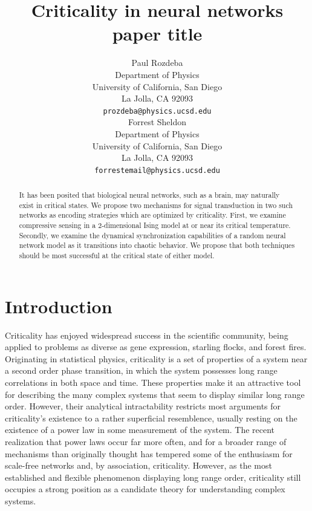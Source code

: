 \documentclass{article} %
\title{Criticality in neural networks paper title}
\author{
Paul Rozdeba%
\\
Department of Physics\\
University of California, San Diego\\
La Jolla, CA 92093 \\
\texttt{prozdeba@physics.ucsd.edu} \\
\And
Forrest Sheldon \\
Department of Physics\\
University of California, San Diego\\
La Jolla, CA 92093 \\
\texttt{forrestemail@physics.ucsd.edu} \\
}
\begin{document}
\maketitle

\begin{abstract}
It has been posited that biological neural networks, such as a brain, may naturally exist in critical states.  We propose two mechanisms for signal transduction in two such networks as encoding strategies which are optimized by criticality.  First, we examine compressive sensing in a 2-dimensional Ising model at or near its critical temperature.  Secondly, we examine the dynamical synchronization capabilities of a random neural network model as it transitions into chaotic behavior.  We propose that both techniques should be most successful at the critical state of either model.
\end{abstract}

\section{Introduction}
Criticality has enjoyed widespread success in the scientific community, being
applied to problems as diverse as gene expression, starling flocks, and forest
fires.\cite{Chialvo2010}  Originating in statistical physics, criticality is a set
of properties of a system near a second order phase transition, in which the
system possesses long range correlations in both space and time.  These
properties make it an attractive tool for describing the many complex systems
that seem to display similar long range order.  However, their analytical
intractability restricts most arguments for criticality's existence to a
rather superficial resemblence, usually resting on the existence of a power
law in some measurement of the system. The recent realization that power laws
occur far more often, and for a broader range of mechanisms than originally
thought has tempered some of the enthusiasm for scale-free networks and, by
association, criticality.\cite{Keller2005} However, as the most established and
flexible phenomenon displaying long range order, criticality still occupies
a strong position as a candidate theory for understanding complex systems.
\end{document}
